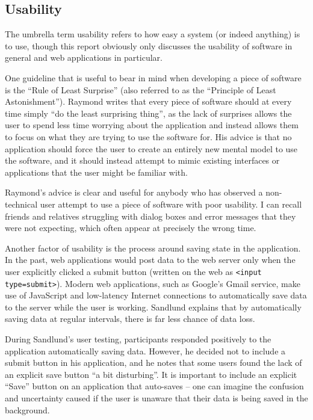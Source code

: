 
\subsection{Usability}

The umbrella term usability refers to how easy a system (or indeed
anything) is to use, though this report obviously only discusses the usability
of software in general and web applications in particular.


One guideline that is useful to bear in mind when developing a piece of
software is the ``Rule of Least Surprise'' \cite{RaymondAUP_2003} (also
referred to as the ``Principle of Least Astonishment''). Raymond writes that
every piece of software should at every time simply ``do the least surprising
thing'', as the lack of surprises allows the user to spend less time worrying
about the application and instead allows them to focus on what they are trying
to use the software for. His advice is that no application should force the
user to create an entirely new mental model to use the software, and it should
instead attempt to mimic existing interfaces or applications that the user
might be familiar with.

Raymond's advice is clear and useful for anybody who has observed a
non-technical user attempt to use a piece of software with poor usability. I
can recall friends and relatives struggling with dialog boxes and error
messages that they were not expecting, which often appear at precisely the
wrong time.

Another factor of usability is the process around saving state in the
application. In the past, web applications would \gls{post} data to the web
server only when the user explicitly clicked a submit button (written on the
web as \texttt{<input type=submit>}). Modern web applications, such as
Google's Gmail service, make use of JavaScript and low-latency Internet
connections to automatically save data to the server while the user is
working. Sandlund \cite{sandlund2009websoftware} explains that by
automatically saving data at regular intervals, there is far less chance of
data loss.

During Sandlund's user testing, participants responded positively to the
application automatically saving data. However, he decided not to include a
submit button in his application, and he notes that some users found the lack
of an explicit save button ``a bit disturbing''. It is important to include an
explicit ``Save'' button on an application that auto-saves -- one can imagine
the confusion and uncertainty caused if the user is unaware that their data is
being saved in the background.
